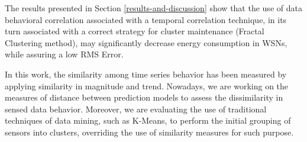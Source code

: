 \documentclass{acm_proc_article-sp}
\begin{document}
The results presented in Section \ref{results-and-discussion} show that the use
of data behavioral correlation associated with a temporal correlation technique,
in its turn associated with a correct strategy for cluster maintenance (Fractal
Clustering method), may significantly decrease energy consumption in WSNs, while
assuring a low RMS Error.
\vspace*{-.3cm}

In this work, the similarity among time series behavior has been measured by
applying similarity in magnitude and trend. Nowadays, we are working on the
measures of distance between prediction models to assess the dissimilarity in
sensed data behavior. Moreover, we are evaluating the use of traditional
techniques of data mining, such as K-Means, to perform the initial grouping of
sensors into clusters, overriding the use of similarity measures for such
purpose.




  
\end{document}
